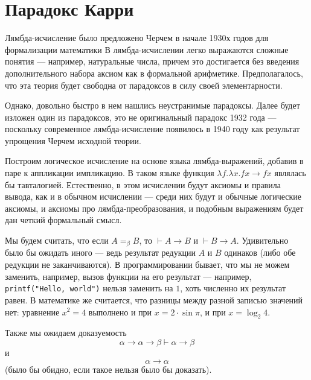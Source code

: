 \section{Парадокс Карри}

Лямбда-исчисление было предложено Черчем в начале 1930х годов 
для формализации математики
В лямбда-исчислении легко 
выражаются сложные понятия --- например, натуральные числа, 
причем это достигается без введения дополнительного набора аксиом
как в формальной арифметике. Предполагалось, что эта теория
будет свободна от парадоксов в силу своей элементарности.

Однако, довольно быстро в нем нашлись неустранимые парадоксы.
Далее будет изложен один из парадоксов, это не оригинальный парадокс
1932 года --- поскольку современное лямбда-исчисление появилось в 1940
году как результат упрощения Черчем исходной теории. %

Построим логическое исчисление на основе языка лямбда-выражений, 
добавив в паре к аппликации импликацию. 
В таком языке функция $\lambda f.\lambda x.f x \rightarrow f x$
являлась бы тавталогией. Естественно, в этом исчислении будут аксиомы
и правила вывода, как и в обычном исчислении --- среди них
будут и обычные логические аксиомы, и аксиомы про лямбда-преобразования, 
и подобным выражениям будет дан четкий формальный смысл.

Мы будем считать, что если $A=_\beta B$, то $\vdash A\rightarrow B$ и
$\vdash B\rightarrow A$.
Удивительно было бы ожидать иного --- ведь результат редукции $A$ и $B$ 
одинаков (либо обе редукции не заканчиваются). 
В программировании бывает, что мы не можем заменить, например,
вызов функции на его результат --- например, \texttt{printf("Hello, world")} нельзя 
заменить на $1$, хоть численно их результат равен.
В математике же считается, что разницы между разной записью значений нет:
уравнение $ x^2 = 4 $ выполнено и при $x = 2 \cdot \sin \pi$,
и при $x = \log_2 4$.

Также мы ожидаем доказуемость 
$$\alpha\rightarrow\alpha\rightarrow\beta\vdash\alpha\rightarrow\beta$$ и
$$\alpha\rightarrow\alpha$$ (было бы обидно, если такое нельзя было бы доказать).



